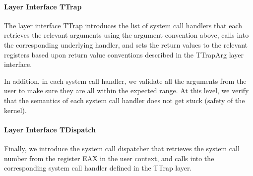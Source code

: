 \paragraph{Layer Interface TTrap}

The layer interface TTrap introduces the list of system call handlers that each retrieves the relevant arguments
using the argument convention above, calls into the corresponding underlying handler, and sets the return values
to the relevant registers based upon return value conventions described in the TTrapArg layer interface.

In addition, in each system call handler, we validate all the arguments from the user to make sure they are all
within the expected range. At this level, we verify that the semantics of each system call handler does not get stuck (safety
of the kernel).

\paragraph{Layer Interface TDispatch}

Finally, we introduce the system call dispatcher that retrieves the system call number from the register
\textsf{EAX} in the user context, and calls into the corresponding system call handler defined in the TTrap layer.

